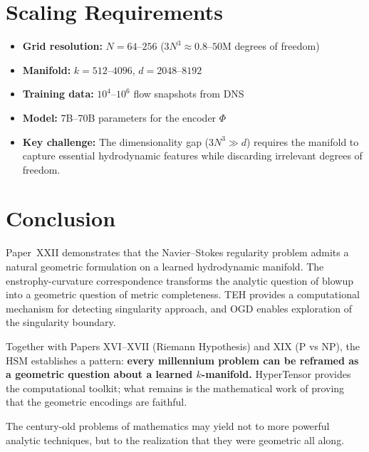 \documentclass{article}
\begin{document}
\section{Scaling Requirements}
\label{sec:scaling}

\begin{itemize}
  \item \textbf{Grid resolution:} $N = 64$--$256$ ($3N^3 \approx 0.8$--$50$M
    degrees of freedom)
  \item \textbf{Manifold:} $k = 512$--$4096$, $d = 2048$--$8192$
  \item \textbf{Training data:} $10^4$--$10^6$ flow snapshots from DNS
  \item \textbf{Model:} 7B--70B parameters for the encoder $\Phi$
  \item \textbf{Key challenge:} The dimensionality gap ($3N^3 \gg d$)
    requires the manifold to capture essential hydrodynamic features
    while discarding irrelevant degrees of freedom.
\end{itemize}

\section{Conclusion}
\label{sec:conclusion}

Paper~XXII demonstrates that the Navier--Stokes regularity problem admits
a natural geometric formulation on a learned hydrodynamic manifold.  The
enstrophy-curvature correspondence transforms the analytic question of
blowup into a geometric question of metric completeness.  TEH provides a
computational mechanism for detecting singularity approach, and OGD enables
exploration of the singularity boundary.

Together with Papers XVI--XVII (Riemann Hypothesis) and XIX (P vs NP), the
HSM establishes a pattern: \textbf{every millennium problem can be reframed
as a geometric question about a learned $k$-manifold.}  HyperTensor provides
the computational toolkit; what remains is the mathematical work of proving
that the geometric encodings are faithful.

The century-old problems of mathematics may yield not to more powerful
analytic techniques, but to the realization that they were geometric all
along.
\end{document}
